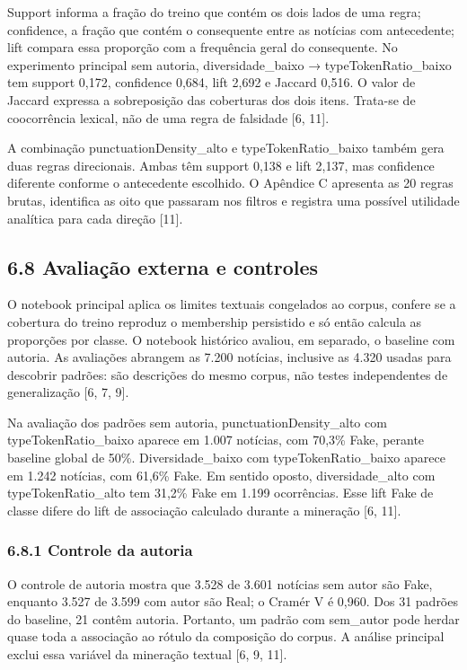 \documentclass[
  brazilian,
  11pt,
]{article}
\begin{document}
Support informa a fração do treino que contém os dois lados de uma regra; confidence, a fração que contém o consequente entre as notícias com antecedente; lift compara essa proporção com a frequência geral do consequente. No experimento principal sem autoria, diversidade\_baixo → typeTokenRatio\_baixo tem support 0,172, confidence 0,684, lift 2,692 e Jaccard 0,516. O valor de Jaccard expressa a sobreposição das coberturas dos dois itens. Trata-se de coocorrência lexical, não de uma regra de falsidade {[}6, 11{]}.

A combinação punctuationDensity\_alto e typeTokenRatio\_baixo também gera duas regras direcionais. Ambas têm support 0,138 e lift 2,137, mas confidence diferente conforme o antecedente escolhido. O Apêndice C apresenta as 20 regras brutas, identifica as oito que passaram nos filtros e registra uma possível utilidade analítica para cada direção {[}11{]}.

\subsection{6.8 Avaliação externa e controles}\label{avaliauxe7uxe3o-externa-e-controles}

O notebook principal aplica os limites textuais congelados ao corpus, confere se a cobertura do treino reproduz o membership persistido e só então calcula as proporções por classe. O notebook histórico avaliou, em separado, o baseline com autoria. As avaliações abrangem as 7.200 notícias, inclusive as 4.320 usadas para descobrir padrões: são descrições do mesmo corpus, não testes independentes de generalização {[}6, 7, 9{]}.

Na avaliação dos padrões sem autoria, punctuationDensity\_alto com typeTokenRatio\_baixo aparece em 1.007 notícias, com 70,3\% Fake, perante baseline global de 50\%. Diversidade\_baixo com typeTokenRatio\_baixo aparece em 1.242 notícias, com 61,6\% Fake. Em sentido oposto, diversidade\_alto com typeTokenRatio\_alto tem 31,2\% Fake em 1.199 ocorrências. Esse lift Fake de classe difere do lift de associação calculado durante a mineração {[}6, 11{]}.

\subsubsection{6.8.1 Controle da autoria}\label{controle-da-autoria}

O controle de autoria mostra que 3.528 de 3.601 notícias sem autor são Fake, enquanto 3.527 de 3.599 com autor são Real; o Cramér V é 0,960. Dos 31 padrões do baseline, 21 contêm autoria. Portanto, um padrão com sem\_autor pode herdar quase toda a associação ao rótulo da composição do corpus. A análise principal exclui essa variável da mineração textual {[}6, 9, 11{]}.
\end{document}
